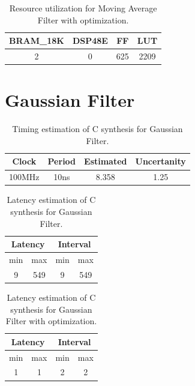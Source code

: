 \documentclass[en,printmode]{mgr}
\begin{document}
	\begin{table}[H]
		\centering
		\caption{}
		\begin{tabular}{|c|c|c|c|}
		\hline
		BRAM\_18K & DSP48E & FF  & LUT \\ \hline
		2         & 0      & 625 & 2209 \\ \hline
		\end{tabular}
		\caption{Resource utilization for Moving Average Filter with optimization.}
	\end{table}
	
	\section{Gaussian Filter}
	\begin{table}[H]
		\centering
		\caption{}
		\begin{tabular}{|c|c|c|c|}
		\hline
		Clock  & Period & Estimated & Uncertanity \\ \hline
		100MHz & 10ns   & 8.358     & 1.25        \\ \hline
		\end{tabular}
		\caption{Timing estimation of C synthesis for Gaussian Filter.}
	\end{table}
	
	\begin{table}[H]
		\centering
		\caption{}
		\begin{tabular}{|c|c|c|c|}
		\hline
		\multicolumn{2}{|c|}{Latency} & \multicolumn{2}{c|}{Interval} \\ \hline
			min           & max           & min           & max           \\ \hline
			9             & 549             & 9             & 549             \\ \hline
		\end{tabular}
		\caption{Latency estimation of C synthesis for Gaussian Filter.}
	\end{table}
	
	\begin{table}[H]
		\centering
		\caption{}
		\begin{tabular}{|c|c|c|c|}
		\hline
		\multicolumn{2}{|c|}{Latency} & \multicolumn{2}{c|}{Interval} \\ \hline
			min           & max           & min           & max           \\ \hline
			1             & 1             & 2             & 2             \\ \hline
		\end{tabular}
		\caption{Latency estimation of C synthesis for Gaussian Filter with optimization.}
	\end{table}
	
\end{document}
